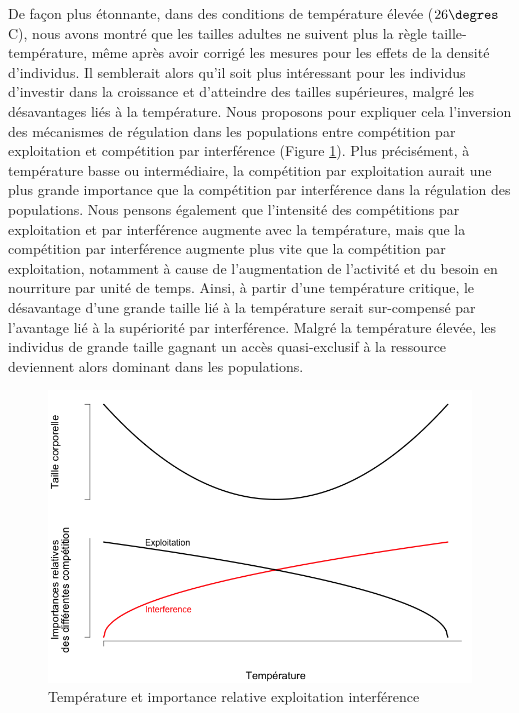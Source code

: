 De façon plus étonnante, dans des conditions de température élevée
($26\degres$C), nous avons montré que les tailles adultes ne suivent plus la
règle taille-température, même après avoir corrigé les mesures pour les effets
de la densité d'individus. Il semblerait alors qu'il soit plus intéressant pour
les individus d'investir dans la croissance et d'atteindre des tailles
supérieures, malgré les désavantages liés à la température. Nous proposons pour
expliquer cela l'inversion des mécanismes de régulation dans les populations
entre compétition par exploitation et compétition par interférence (Figure
\ref{fig:Concl2}). Plus précisément, à température basse ou intermédiaire, la
compétition par exploitation aurait une plus grande importance que la
compétition par interférence dans la régulation des populations. Nous pensons
également que l'intensité des compétitions par exploitation et par interférence
augmente avec la température, mais que la compétition par interférence augmente
plus vite que la compétition par exploitation, notamment à cause de
l'augmentation de l'activité et du besoin en nourriture par unité de temps.
Ainsi, à partir d'une température critique, le désavantage d'une grande taille
lié à la température serait sur-compensé par l'avantage lié à la supériorité par
interférence. Malgré la température élevée, les individus de grande taille
gagnant un accès quasi-exclusif à la ressource deviennent alors dominant dans
les populations.

\begin{figure}[!ht]
\begin{center}
\includegraphics[width=1\textwidth]{Conclu/TempSizeRule2}
\caption[Température et importance relative
exploitation interférence]{Température et importance relative
exploitation interférence}
\label{fig:Concl2}
\end{center}
\end{figure}


